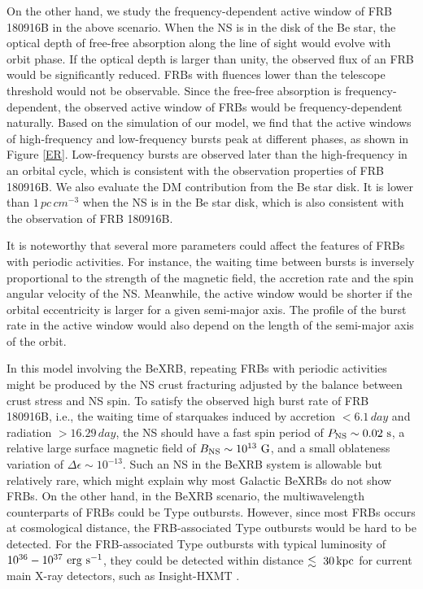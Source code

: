 \documentclass[twocolumn]{aastex62}
\begin{document}
On the other hand, we study the frequency-dependent active window of FRB 180916B in the above scenario. When the NS is in the disk of the Be star, the optical depth of free-free absorption along the line of sight would evolve with orbit phase. If the optical depth is larger than unity, the observed flux of an FRB would be significantly reduced.
FRBs with fluences lower than the telescope threshold would not be observable. Since the free-free absorption is frequency-dependent, the observed active window of FRBs would be frequency-dependent naturally.
Based on the simulation of our model, we find that the active windows of high-frequency and low-frequency bursts peak at different phases, as shown in Figure \ref{ER}. Low-frequency bursts are observed later than the high-frequency in an orbital cycle, which is consistent with the observation properties of FRB 180916B.
We also evaluate the DM contribution from the Be star disk.
It is lower than $ 1 \,\unit{pc\,cm^{-3}}$ when the NS is in the Be star disk, which is also consistent with the observation of FRB 180916B.

It is noteworthy that several more parameters could
affect the features of FRBs with periodic activities.
For instance, the waiting time between bursts is inversely proportional to the strength of the magnetic field, the accretion rate and the spin angular
velocity of the NS. Meanwhile, the active window would be 
shorter if the orbital eccentricity is larger for a given semi-major axis. The profile of the burst rate in the active window would also depend on the length of the semi-major axis of the orbit.

In this model involving the BeXRB, repeating FRBs with periodic activities might be produced by the NS crust fracturing adjusted by the balance between crust stress and NS spin.
To satisfy the observed high burst rate of FRB 180916B, i.e., the waiting time of starquakes induced by accretion $ < 6.1\,\unit{day}$ and radiation $ > 16.29\,\unit{day}$, the NS should have a fast spin period of $P_{\rm NS}\sim0.02~{\rm s}$, a relative large surface magnetic field of $B_{\rm NS}\sim 10^{13}~{\rm G}$, and a small oblateness variation of $\Delta \epsilon\sim10^{-13}$. Such an NS in the BeXRB system is allowable but relatively rare, which might explain why most Galactic BeXRBs do not show FRBs.
On the other hand, in the BeXRB scenario, the multiwavelength counterparts of FRBs could be Type \uppercase\expandafter{} outbursts. However, since most FRBs occurs at cosmological distance, the FRB-associated Type \uppercase\expandafter{} outbursts would be hard to be detected. For the FRB-associated Type \uppercase\expandafter{} outbursts with typical luminosity of $10^{36}-10^{37}~{\rm erg~s^{-1}}$, they could be detected within distance $\lesssim ~{30 \,\rm kpc}$ for current main X-ray detectors, such as Insight-HXMT \citep{hxmt}. 
\end{document}
